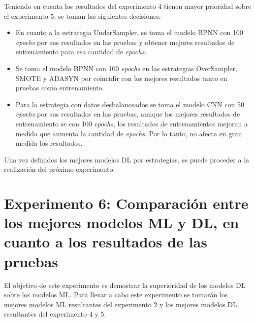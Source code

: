    Teniendo en cuenta los resultados del experimento 4 tienen mayor prioridad sobre el experimento 5, se toman las siguientes decisiones:
    \begin{itemize}
    	\item En cuanto a la estrategia UnderSampler, se toma el modelo BPNN con 100 \textit{epochs} por sus resultados en las pruebas y obtener mejores resultados de entrenamiento para esa cantidad de \textit{epochs}.
    	\item Se toma el modelo BPNN con 100 \textit{epochs} en las estrategias OverSampler, SMOTE y ADASYN por coincidir con los mejores resultados tanto en pruebas como entrenamiento.
    	\item Para la estrategia con datos desbalanceados se toma el modelo CNN con 50 \textit{epochs} por sus resultados en las pruebas, aunque los mejores resultados de entrenamiento se con 100 \textit{epochs}, los resultados de entrenamientos mejoran a medida que aumenta la cantidad de \textit{epochs}. Por lo tanto, no afecta en gran medida los resultados.
    \end{itemize}
  
  Una vez definidos los mejores modelos DL por estrategias, se puede proceder a la realizaci\'{o}n del pr\'{o}ximo experimento.
  
  \section{Experimento 6: Comparaci\'{o}n entre los mejores modelos ML y DL, en cuanto a los resultados de las pruebas}
  
    El objetivo de este experimento es demostrar la superioridad de los modelos DL sobre los modelos ML. Para llevar a cabo este experimento se tomar\'{a}n los mejores modelos ML resultantes del experimento 2 y los mejores modelos DL resultantes del experimento 4 y 5.
  
